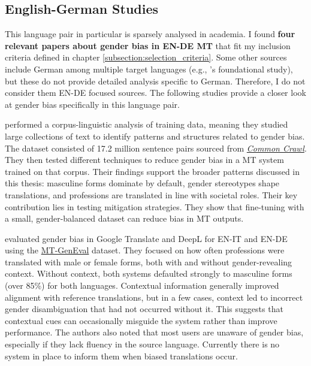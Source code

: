 \subsection{English-German Studies}
This language pair in particular is sparsely analysed in academia. I found \textbf{four relevant papers about gender bias in EN-DE MT} that fit my inclusion criteria defined in chapter \ref{subsection:selection_criteria}. Some other sources include German among multiple target languages (e.g., \citeauthor{stanovskyEvaluatingGenderBias2019}'s foundational study), but these do not provide detailed analysis specific to German. Therefore, I do not consider them EN-DE focused sources. The following studies provide a closer look at gender bias specifically in this language pair.

\textbf{\cite{ullmannGenderBiasMachine2022}} performed a corpus-linguistic analysis of training data, meaning they studied large collections of text to identify patterns and structures related to gender bias. The dataset consisted of 17.2 million sentence pairs sourced from \href{https://commoncrawl.org/}{\textit{Common Crawl}}. They then tested different techniques to reduce gender bias in a MT system trained on that corpus. Their findings support the broader patterns discussed in this thesis: masculine forms dominate by default, gender stereotypes shape translations, and professions are translated in line with societal roles. Their key contribution lies in testing mitigation strategies. They show that fine-tuning with a small, gender-balanced dataset can reduce bias in MT outputs. 

\textbf{\citet{rescignoGenderBiasMachine2023}} evaluated gender bias in Google Translate and DeepL for EN-IT and EN-DE using the \href{https://github.com/amazon-science/machine-translation-gender-eval}{MT-GenEval} dataset. They focused on how often professions were translated with male or female forms, both with and without gender-revealing context. Without context, both systems defaulted strongly to masculine forms (over 85\%) for both languages. Contextual information generally improved alignment with reference translations, but in a few cases, context led to incorrect gender disambiguation that had not occurred without it. This suggests that contextual cues can occasionally misguide the system rather than improve performance. The authors also noted that most users are unaware of gender bias, especially if they lack fluency in the source language. Currently there is no system in place to inform them when biased translations occur.

